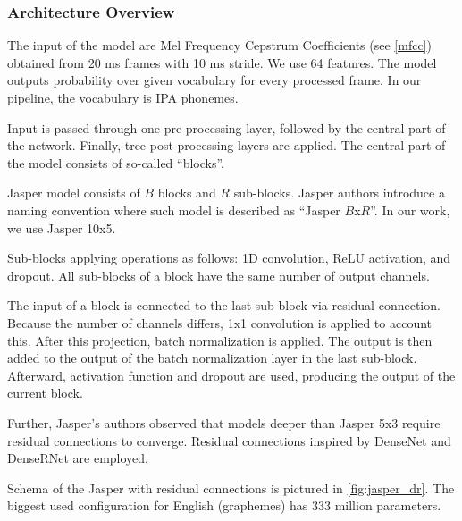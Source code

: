 \subsubsection{Architecture Overview}
The input of the model are Mel Frequency Cepstrum Coefficients (see \cref{mfcc}) obtained from 20 ms frames with 10 ms stride. We use 64 features. The model outputs probability over given vocabulary for every processed frame. In our pipeline, the vocabulary is IPA phonemes.

Input is passed through one pre-processing layer, followed by the central part of the network. Finally, tree post-processing layers are applied. The central part of the model consists of so-called ``blocks''.

Jasper model consists of $B$ blocks and $R$ sub-blocks. Jasper authors introduce a naming convention where such model is described as ``Jasper $B$x$R$''. In our work, we use Jasper 10x5.

Sub-blocks applying operations as follows: 1D convolution, ReLU activation, and dropout. All sub-blocks of a block have the same number of output channels. 

The input of a block is connected to the last sub-block via residual connection. Because the number of channels differs, 1x1 convolution is applied to account this. After this projection, batch normalization is applied. The output is then added to the output of the batch normalization layer in the last sub-block. Afterward, activation function and dropout are used, producing the output of the current block.

Further, Jasper's authors observed that models deeper than Jasper 5x3 require residual connections to converge. Residual connections inspired by DenseNet  and DenseRNet  are employed.

Schema of the Jasper with residual connections is pictured in \cref{fig:jasper_dr}. The biggest used configuration for English (graphemes) has 333 million parameters.

